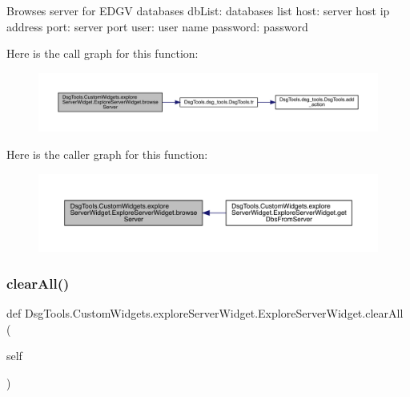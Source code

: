 \begin{DoxyVerb}Browses server for EDGV databases
dbList: databases list
host: server host ip address
port: server port
user: user name
password: password
\end{DoxyVerb}
 Here is the call graph for this function\+:
\nopagebreak
\begin{figure}[H]
\begin{center}
\leavevmode
\includegraphics[width=350pt]{class_dsg_tools_1_1_custom_widgets_1_1explore_server_widget_1_1_explore_server_widget_a7bcfcb38d11d334887e710b5c7980570_cgraph}
\end{center}
\end{figure}
Here is the caller graph for this function\+:
\nopagebreak
\begin{figure}[H]
\begin{center}
\leavevmode
\includegraphics[width=350pt]{class_dsg_tools_1_1_custom_widgets_1_1explore_server_widget_1_1_explore_server_widget_a7bcfcb38d11d334887e710b5c7980570_icgraph}
\end{center}
\end{figure}
\mbox{\label{class_dsg_tools_1_1_custom_widgets_1_1explore_server_widget_1_1_explore_server_widget_ac9852a6167cf95dbcb026e2b94c0174f}} 
\subsubsection{\texorpdfstring{clear\+All()}{clearAll()}}
{\footnotesize\ttfamily def Dsg\+Tools.\+Custom\+Widgets.\+explore\+Server\+Widget.\+Explore\+Server\+Widget.\+clear\+All (\begin{DoxyParamCaption}\item[{}]{self }\end{DoxyParamCaption})}

